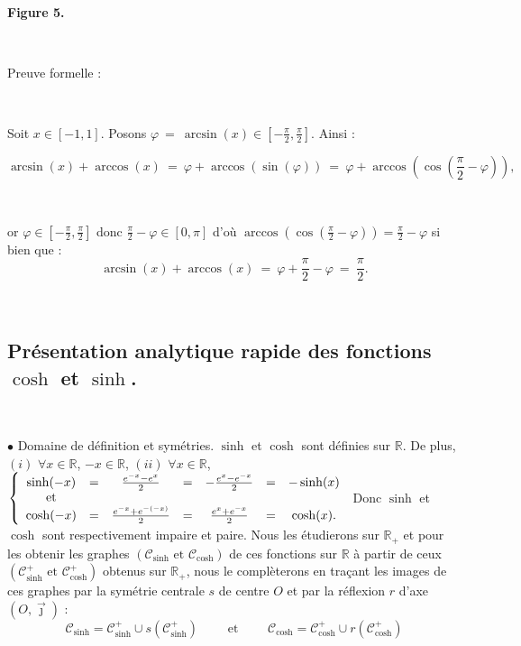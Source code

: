 \documentclass{article}
\begin{document}
\begin{center}
\

\textbf{Figure 5.}
\end{center}

\

Preuve formelle : 

\

Soit $x\in [-1,1]$. Posons  $\varphi \ = \ \arcsin(x) \in \left[-\frac{\pi}{2},\frac{\pi}{2}\right]$. Ainsi : 

\[
\arcsin(x) + \arccos(x) \ = \ \varphi + \arccos(\sin(\varphi)) \ = \ \varphi + \arccos \left( \cos \left( \frac{\pi}{2}- \varphi \right) \right),
\]

\

or $\varphi \in \left[-\frac{\pi}{2},\frac{\pi}{2}\right]$ donc
$\frac{\pi}{2}- \varphi \in [0,\pi]$ d'où $\arccos \left( \cos \left( \frac{\pi}{2}- \varphi \right) \right) = \frac{\pi}{2}- \varphi$ si bien que : 
\[
\arcsin(x) + \arccos(x) \ = \  \varphi +\frac{\pi}{2} - \varphi \ = \ \frac{\pi}{2}.
\]

\

\subsection{Présentation analytique rapide des fonctions \(\cosh\) et \(\sinh \).} 

\

$\bullet$ Domaine de définition et symétries.
\newline
$\sinh$ et $\cosh$ sont définies sur $\mathbb{R}$. 
\newline
De plus, 
\newline
$(i)$ $\forall x \in \mathbb{R}$, $-x\in \mathbb{R}$, 
\newline
$(ii)$ $\forall x \in \mathbb{R}$, 
$
\left\{ \begin{array}{c c c c c c c}
\sinh (-x) & = & \frac{e^{-x} - e^{x}}{2} & = & - \frac{e^x - e^{-x}}{2} & = & -\sinh(x) \\
\text{et} & & & & & & \\ 
\cosh (-x) & = & \frac{e^{-x} + e^{-(-x)}}{2} & = &  \frac{e^x + e^{-x}}{2} & = & \cosh(x).
\end{array} 
\right.
$
\newline
Donc $\sinh$ et $\cosh$ sont respectivement impaire et paire.
\newline
Nous les étudierons sur $\mathbb{R}_+$ et pour les obtenir les graphes $(\mathcal{C}_{\sinh} \text{ et } \mathcal{C}_{\cosh})$ de ces fonctions sur $\mathbb{R}$ à partir de ceux $(\mathcal{C}_{\sinh}^+ \text{ et } \mathcal{C}_{\cosh}^+)$ obtenus sur $\mathbb{R}_+$, nous le complèterons en traçant les images de ces graphes par la symétrie centrale $s$ de centre $O$ et par la réflexion $r$ d'axe $\left( O, \overrightarrow{\jmath} \right)$ : 
\[
\mathcal{C}_{\sinh} = \mathcal{C}_{\sinh}^+ \cup s \left( \mathcal{C}_{\sinh}^+ \right) \qquad \text{ et } \qquad \mathcal{C}_{\cosh} = \mathcal{C}_{\cosh}^+ \cup r \left( \mathcal{C}_{\cosh}^+ \right)
\]
\end{document}
